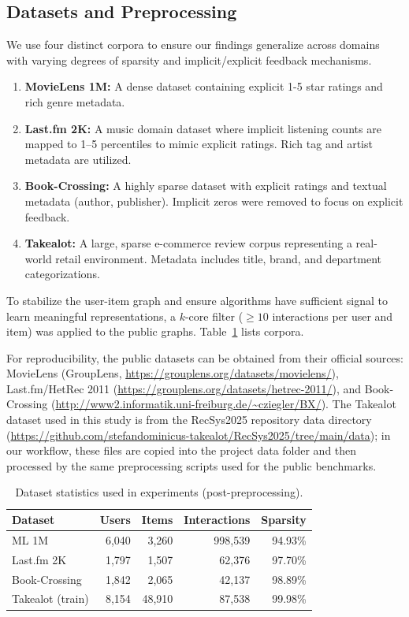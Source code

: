 \documentclass[conference]{IEEEtran}
\begin{document}
\subsection{Datasets and Preprocessing}

We use four distinct corpora to ensure our findings generalize across domains with varying degrees of sparsity and implicit/explicit feedback mechanisms.

\begin{enumerate}
    \item \textbf{MovieLens 1M:} A dense dataset containing explicit 1-5 star ratings and rich genre metadata.
    \item \textbf{Last.fm 2K:} A music domain dataset where implicit listening counts are mapped to 1--5 percentiles to mimic explicit ratings. Rich tag and artist metadata are utilized.
    \item \textbf{Book-Crossing:} A highly sparse dataset with explicit ratings and textual metadata (author, publisher). Implicit zeros were removed to focus on explicit feedback.
    \item \textbf{Takealot:} A large, sparse e-commerce review corpus representing a real-world retail environment. Metadata includes title, brand, and department categorizations.
\end{enumerate}

To stabilize the user-item graph and ensure algorithms have sufficient signal to learn meaningful representations, a $k$-core filter ($\geq 10$ interactions per user and item) was applied to the public graphs. Table~\ref{tab:datasets} lists corpora.

For reproducibility, the public datasets can be obtained from their official sources: MovieLens (GroupLens, \url{https://grouplens.org/datasets/movielens/}), Last.fm/HetRec 2011 (\url{https://grouplens.org/datasets/hetrec-2011/}), and Book-Crossing (\url{http://www2.informatik.uni-freiburg.de/~cziegler/BX/}). The Takealot dataset used in this study is from the RecSys2025 repository data directory (\url{https://github.com/stefandominicus-takealot/RecSys2025/tree/main/data}); in our workflow, these files are copied into the project data folder and then processed by the same preprocessing scripts used for the public benchmarks.

\begin{table}[!t]
  \centering
  \caption{Dataset statistics used in experiments (post-preprocessing).}
  \label{tab:datasets}
  \begin{tabular}{@{}lrrrr@{}}
    \toprule
    \textbf{Dataset} & \textbf{Users} & \textbf{Items} & \textbf{Interactions} & \textbf{Sparsity} \\
    \midrule
    ML 1M & 6,040 & 3,260 & 998,539 & 94.93\% \\
    Last.fm 2K & 1,797 & 1,507 & 62,376 & 97.70\% \\
    Book-Crossing & 1,842 & 2,065 & 42,137 & 98.89\% \\
    Takealot (train) & 8,154 & 48,910 & 87,538 & 99.98\% \\
    \bottomrule
  \end{tabular}
\end{table}
\end{document}
